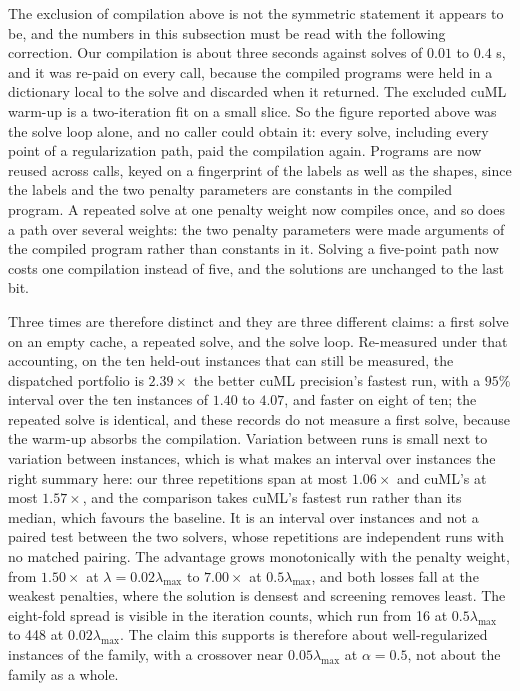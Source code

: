 The exclusion of compilation above is not the symmetric statement it appears to be,
and the numbers in this subsection must be read with the following correction. Our
compilation is about three seconds against solves of $0.01$ to $0.4$ s, and it was re-paid on every call, because the compiled programs were held in a
dictionary local to the solve and discarded when it returned. The excluded cuML
warm-up is a two-iteration fit on a small slice. So the figure reported above was the
solve loop alone, and no caller could obtain it: every solve, including every point of
a regularization path, paid the compilation again. Programs are now reused across
calls, keyed on a fingerprint of the labels as well as the shapes, since the labels and
the two penalty parameters are constants in the compiled program. A repeated solve at
one penalty weight now compiles once, and so does a path over several weights: the two
penalty parameters were made arguments of the compiled program rather than constants
in it. Solving a five-point path now costs one compilation instead of five, and the
solutions are unchanged to the last bit.

Three times are therefore distinct and they are three different claims: a first solve
on an empty cache, a repeated solve, and the solve loop. Re-measured under that
accounting, on the ten held-out instances that can still be measured, the dispatched
portfolio is $2.39\times$ the better cuML precision's fastest run, with a $95\%$
interval over the ten instances of $1.40$ to $4.07$, and faster on eight of ten; the
repeated solve is identical, and these records do not measure a first solve, because
the warm-up absorbs the compilation. Variation between runs is small next to variation
between instances, which is what makes an interval over instances the right summary
here: our three repetitions span at most $1.06\times$ and cuML's at most $1.57\times$,
and the comparison takes cuML's fastest run rather than its median, which favours the
baseline. It is an interval over instances and not a paired test between the two
solvers, whose repetitions are independent runs with no matched pairing. The advantage grows monotonically with
the penalty weight, from $1.50\times$ at $\lambda = 0.02\lambda_{\max}$ to
$7.00\times$ at $0.5\lambda_{\max}$, and both losses fall at the weakest penalties,
where the solution is densest and screening removes least. The eight-fold spread is
visible in the iteration counts, which run from 16 at $0.5\lambda_{\max}$ to 448 at
$0.02\lambda_{\max}$. The claim this supports is therefore about well-regularized
instances of the family, with a crossover near $0.05\lambda_{\max}$ at $\alpha=0.5$,
not about the family as a whole.

